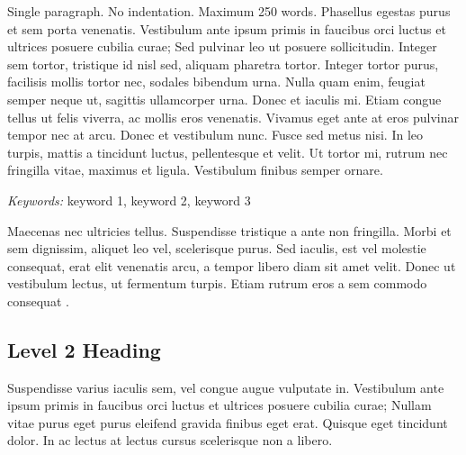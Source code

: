 \documentclass[a4paper,12pt,stu,donotrepeattitle,floatsintext,twoside]{apa7}
\begin{document}
{%
\relax
{}\relax
\noindent Single paragraph. No indentation. Maximum 250 words. Phasellus egestas purus et sem porta venenatis. Vestibulum ante ipsum primis in faucibus orci luctus et ultrices posuere cubilia curae; Sed pulvinar leo ut posuere sollicitudin. Integer sem tortor, tristique id nisl sed, aliquam pharetra tortor. Integer tortor purus, facilisis mollis tortor nec, sodales bibendum urna. Nulla quam enim, feugiat semper neque ut, sagittis ullamcorper urna. Donec et iaculis mi. Etiam congue tellus ut felis viverra, ac mollis eros venenatis. Vivamus eget ante at eros pulvinar tempor nec at arcu. Donec et vestibulum nunc. Fusce sed metus nisi. In leo turpis, mattis a tincidunt luctus, pellentesque et velit. Ut tortor mi, rutrum nec fringilla vitae, maximus et ligula. Vestibulum finibus semper ornare.

\textit{Keywords:} keyword 1, keyword 2, keyword 3
\vspace{0.75\baselineskip}
}


Maecenas nec ultricies tellus. Suspendisse tristique a ante non fringilla. Morbi et sem dignissim, aliquet leo vel, scelerisque purus. Sed iaculis, est vel molestie consequat, erat elit venenatis arcu, a tempor libero diam sit amet velit. Donec ut vestibulum lectus, ut fermentum turpis. Etiam rutrum eros a sem commodo consequat \parencite{Ludtkeetal2008}.

\subsection{Level 2 Heading}

Suspendisse varius iaculis sem, vel congue augue vulputate in. Vestibulum ante ipsum primis in faucibus orci luctus et ultrices posuere cubilia curae; Nullam vitae purus eget purus eleifend gravida finibus eget erat. Quisque eget tincidunt dolor. In ac lectus at lectus cursus scelerisque non a libero.
\end{document}
